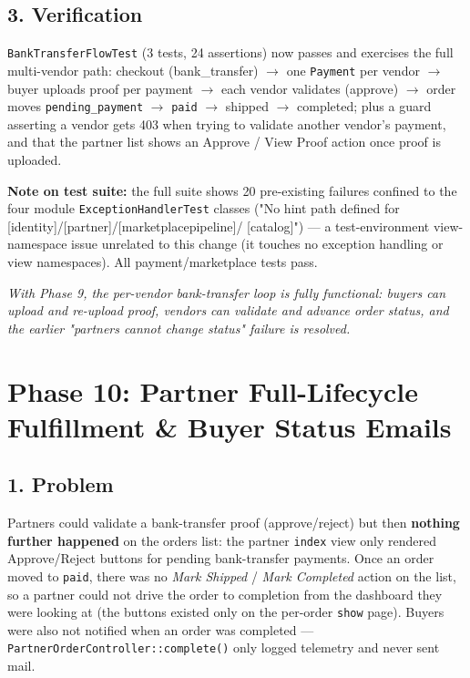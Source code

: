 \documentclass[12pt,a4paper]{article}
\begin{document}
\subsection{3. Verification}

\texttt{BankTransferFlowTest} (3 tests, 24 assertions) now passes and exercises the full multi-vendor path:
checkout (bank\_transfer) $\rightarrow$ one \texttt{Payment} per vendor $\rightarrow$ buyer uploads proof per
payment $\rightarrow$ each vendor validates (approve) $\rightarrow$ order moves \texttt{pending\_payment}
$\rightarrow$ \texttt{paid} $\rightarrow$ shipped $\rightarrow$ completed; plus a guard asserting a vendor
gets 403 when trying to validate another vendor's payment, and that the partner list shows an Approve /
View Proof action once proof is uploaded.

\textbf{Note on test suite:} the full suite shows 20 pre-existing failures confined to the four module
\texttt{ExceptionHandlerTest} classes ("No hint path defined for [identity]/[partner]/[marketplacepipeline]/
[catalog]") — a test-environment view-namespace issue unrelated to this change (it touches no exception
handling or view namespaces). All payment/marketplace tests pass.

\vfill
\begin{center}
    \textit{With Phase 9, the per-vendor bank-transfer loop is fully functional: buyers can upload and re-upload proof, vendors can validate and advance order status, and the earlier "partners cannot change status" failure is resolved.}
\end{center}

\section{Phase 10: Partner Full-Lifecycle Fulfillment \& Buyer Status Emails}

\subsection{1. Problem}

Partners could validate a bank-transfer proof (approve/reject) but then \textbf{nothing further happened}
on the orders list: the partner \texttt{index} view only rendered Approve/Reject buttons for pending
bank-transfer payments. Once an order moved to \texttt{paid}, there was no \emph{Mark Shipped} /
\emph{Mark Completed} action on the list, so a partner could not drive the order to completion from the
dashboard they were looking at (the buttons existed only on the per-order \texttt{show} page). Buyers were
also not notified when an order was completed — \texttt{PartnerOrderController::complete()} only logged
telemetry and never sent mail.
\end{document}
